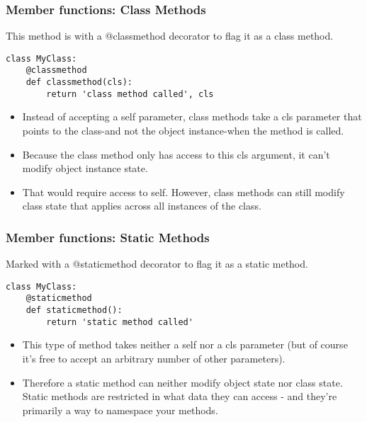 \begin{frame}[fragile]\frametitle{Member functions: Class Methods}
This method is with a @classmethod decorator to flag it as a class method.
\begin{lstlisting}
class MyClass:
    @classmethod
    def classmethod(cls):
        return 'class method called', cls

\end{lstlisting}
  \begin{itemize}
  \item Instead of accepting a self parameter, class methods take a cls parameter that points to the class-and not the object instance-when the method is called.
  \item Because the class method only has access to this cls argument, it can't modify object instance state. 
    \item That would require access to self. However, class methods can still modify class state that applies across all instances of the class.
  \end{itemize}
  
\end{frame}

\begin{frame}[fragile]\frametitle{Member functions: Static Methods}
Marked with a @staticmethod decorator to flag it as a static method.
\begin{lstlisting}
class MyClass:
    @staticmethod
    def staticmethod():
        return 'static method called'

\end{lstlisting}
  \begin{itemize}
  \item This type of method takes neither a self nor a cls parameter (but of course it's free to accept an arbitrary number of other parameters).
  \item Therefore a static method can neither modify object state nor class state. Static methods are restricted in what data they can access - and they're primarily a way to namespace your methods.
  \end{itemize}
  
\end{frame}


